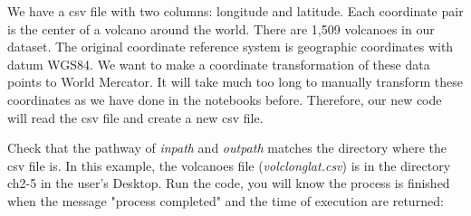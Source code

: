 \documentclass[a4paper , 12pt]{book}
\begin{document}
We have a csv file with two columns: longitude and latitude. Each coordinate pair is the center of a volcano around the world. There are 1,509 volcanoes in our dataset. The original coordinate reference system is geographic coordinates with datum WGS84. We want to make a coordinate transformation of these data points to World Mercator. It will take much too long to manually transform these coordinates as we have done in the notebooks before. Therefore, our new code will read the csv file and create a new csv file.

Check that the pathway of \textit{in\textunderscore path} and \textit{out\textunderscore path} matches the directory where the csv file is. In this example, the volcanoes file (\textit{volc\textunderscore longlat.csv}) is in the directory ch2-5 in the user's Desktop. Run the code, you will know the process is finished when the message "process completed" and the time of execution are returned:
\end{document}
